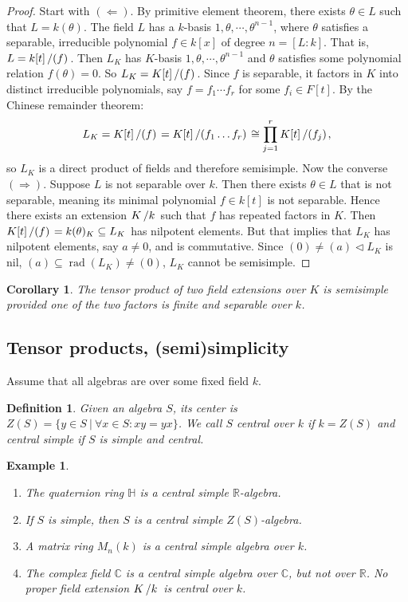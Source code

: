 \documentclass[10pt, a4paper]{article}
\newtheorem{corollary}[thm]{Corollary}
\newtheorem{defi}[thm]{Definition}
\newenvironment{noticeB}{%
  \tcolorbox[%
  notitle,
  empty,
  enhanced,  %
  breakable,
  coltext=black,
  colback=white, 
  fontupper=\rmfamily,
  noparskip,
  sharp corners,
  boxrule=-1pt,  %
  frame hidden,
  left=7pt,  %
  right=7pt,
  top=5pt,
  bottom=5pt,
  before skip=2.5ex plus 2pt,
  after skip=2.5ex plus 2pt,
  borderline west = {1.5pt}{-0.1pt}{blue!30!black}, %
  overlay unbroken and last={%
    \draw[color=black, line width=1.25pt]
    ($(frame.south west)+(1.pt, -0.1pt)$) -- ++(2em, 0);
  }
  ]}
{\endtcolorbox}
\newenvironment{definition}{\begin{noticeB}\begin{defi}}{%
    \end{defi}\end{noticeB}}
\newtheorem{example}[thm]{Example}
\newenvironment{noticeC}{%
  \tcolorbox[%
  notitle,
  empty,
  enhanced,  %
  breakable,
  coltext=black, 
  fontupper=\rmfamily,
  noparskip,
  sharp corners,
  boxrule=-1pt,  %
  frame hidden,
  left=7pt,  %
  right=7pt,
  top=5pt,
  bottom=5pt,
  before skip=2.5ex plus 2pt,
  after skip=2.5ex plus 2pt,
  overlay unbroken and last={%
  },
  ]}
{\endtcolorbox}
\newenvironment{myproof}%
  {\begin{noticeC}\begin{proof}}%
  {\end{proof}\end{noticeC}}
\newcommand{\R}{\mathbb {R}}
\newcommand{\C}{\mathbb {C}}
\newcommand{\Ha}{\mathbb {H}}
\newcommand{\quot}[2]{{\raisebox{0em}{$#1$}\left/\raisebox{0em}{$#2$}\right.}}
\DeclareMathOperator{\rad}{rad}
\begin{document}
\begin{myproof}
  Start with $(\Leftarrow)$. By primitive element theorem, there exists $\theta \in L$ such that $L = k(\theta)$.
  The field $L$ has a $k$-basis $1, \theta, \cdots, \theta^{n - 1}$, where $\theta$ satisfies 
  a separable, irreducible polynomial $f \in k[x]$ of degree $n = [L:k]$.
  That is, $L = \quot{k[t]}{(f)}$. Then $L_K$ has $K$-basis $1, \theta, \cdots, \theta^{n - 1}$
  and $\theta$ satisfies some polynomial relation $f(\theta) = 0$.
  So $L_K = \quot{K[t]}{(f)}$. Since $f$ is separable, it factors in $K$
  into distinct irreducible polynomials, say $f = f_1 \cdots f_r$
  for some $f_i \in F[t]$. By the Chinese remainder theorem:
  $$L_K = \quot{K[t]}{(f)} = \quot{K[t]}{(f_1 \dots f_r)} \cong \prod_{j = 1} ^r \quot{K[t]}{(f_j)},$$
  so $L_K$ is a direct product of fields and therefore semisimple.
  Now the converse $(\Rightarrow)$. Suppose $L$ is not separable over $k$.
  Then there exists $\theta \in L$ that is not separable, meaning its minimal polynomial $f \in k[t]$ is not separable.
  Hence there exists an extension $\quot{K}{k}$ such that $f$ has repeated factors in $K$.
  Then $\quot{K[t]}{(f)} = k(\theta)_K \subseteq L_K$ has nilpotent elements.
  But that implies that $L_K$ has nilpotent elements, say $a \neq 0$, and is commutative.
  Since $(0) \neq (a) \lhd L_K$ is nil, $(a) \subseteq \rad (L_K) \neq (0)$, $L_K$ cannot be semisimple.
\end{myproof}

\begin{corollary}
  The tensor product of two field extensions over $K$ is semisimple provided one of the two factors is finite and separable over $k$.
\end{corollary}

\subsection{Tensor products, (semi)simplicity}

Assume that all algebras are over some fixed field $k$.

\begin{definition}
  Given an algebra $S$, its center is $Z(S) = \{y \in S\ |\ \forall x \in S: xy = yx\}$.
  We call $S$ central over $k$ if $k = Z(S)$ and central simple if $S$ is simple and central.
\end{definition}

\begin{example}
  \begin{enumerate}
    \item The quaternion ring $\Ha$ is a central simple $\R$-algebra.
    \item If $S$ is simple, then $S$ is a central simple $Z(S)$-algebra.
    \item A matrix ring $M_n (k)$ is a central simple algebra over $k$.
    \item The complex field $\C$ is a central simple algebra over $\C$, but not over $\R$.
    No proper field extension $\quot{K}{k}$ is central over $k$.
  \end{enumerate}
\end{example}
\end{document}
